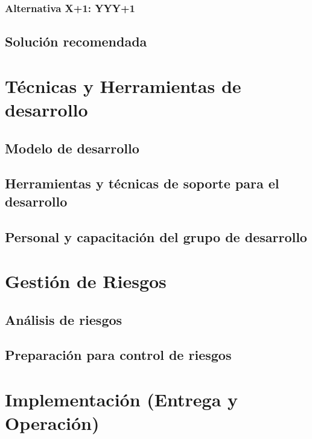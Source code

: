 \documentclass[letterpaper,spanish,10pt]{article}
\begin{document}
\subsubsection{Alternativa X+1: YYY+1}



\subsection{Soluci\'on recomendada}



\section{T\'ecnicas y Herramientas de desarrollo} %
\subsection{Modelo de desarrollo}



\subsection{Herramientas y t\'ecnicas de soporte para el desarrollo}



\subsection{Personal y capacitaci\'on del grupo de desarrollo}



\section{Gesti\'on de Riesgos} %
\subsection{An\'alisis de riesgos}



\subsection{Preparaci\'on para control de riesgos}



\section{Implementaci\'on (Entrega y Operaci\'on)} %
\end{document}
